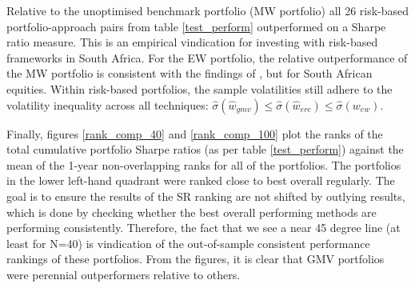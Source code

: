 \documentclass[a4paper,11pt,nocenter,bold,noupper,headcount]{mythesis}
\theoremstyle{plain}
\theoremstyle{definition}
\begin{document}

Relative to the unoptimised benchmark portfolio (MW portfolio) all 26 risk-based portfolio-approach pairs from table \ref{test_perform} outperformed on a Sharpe ratio measure. This is an empirical vindication for investing with risk-based frameworks in South Africa. For the EW portfolio, the relative outperformance of the MW portfolio is consistent with the findings of \cite{DGL07}, but for South African equities. Within risk-based portfolios, the sample volatilities still adhere to the volatility inequality across all techniques: $\hat{\sigma}(\hat{w}_{gmv}) \leq \hat{\sigma}(\hat{w}_{erc}) \leq \hat{\sigma}(w_{ew})$. 

Finally, figures \ref{rank_comp_40} and \ref{rank_comp_100} plot the ranks of the total cumulative portfolio Sharpe ratios (as per table \ref{test_perform}) against the mean of the 1-year non-overlapping ranks for all of the portfolios. The portfolios in the lower left-hand quadrant were ranked close to best overall regularly. The goal is to ensure the results of the SR ranking are not shifted by outlying results, which is done by checking whether the best overall performing methods are performing consistently. Therefore, the fact that we see a near 45 degree line (at least for N=40) is vindication of the out-of-sample consistent performance rankings of these portfolios. From the figures, it is clear that GMV portfolios were perennial outperformers relative to others.
\end{document}
